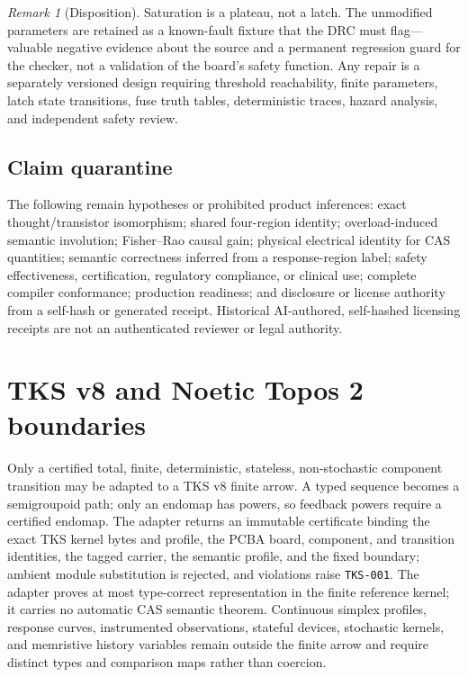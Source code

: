 \documentclass[11pt]{amsart}
\theoremstyle{definition}
\theoremstyle{remark}
\newtheorem{remark}[theorem]{Remark}
\begin{document}
\begin{remark}[Disposition]
Saturation is a plateau, not a latch. The unmodified parameters are retained as a known-fault fixture that the DRC must flag---valuable negative evidence about the source and a permanent regression guard for the checker, not a validation of the board's safety function. Any repair is a separately versioned design requiring threshold reachability, finite parameters, latch state transitions, fuse truth tables, deterministic traces, hazard analysis, and independent safety review.
\end{remark}

\subsection{Claim quarantine}
The following remain hypotheses or prohibited product inferences: exact thought/transistor isomorphism; shared four-region identity; overload-induced semantic involution; Fisher--Rao causal gain; physical electrical identity for CAS quantities; semantic correctness inferred from a response-region label; safety effectiveness, certification, regulatory compliance, or clinical use; complete compiler conformance; production readiness; and disclosure or license authority from a self-hash or generated receipt. Historical AI-authored, self-hashed licensing receipts are not an authenticated reviewer or legal authority.

\section{TKS v8 and Noetic Topos 2 boundaries}\label{sec:tks}

Only a certified total, finite, deterministic, stateless, non-stochastic component transition may be adapted to a TKS v8 finite arrow. A typed sequence becomes a semigroupoid path; only an endomap has powers, so feedback powers require a certified endomap. The adapter returns an immutable certificate binding the exact TKS kernel bytes and profile, the PCBA board, component, and transition identities, the tagged carrier, the semantic profile, and the fixed boundary; ambient module substitution is rejected, and violations raise \texttt{TKS-001}. The adapter proves at most type-correct representation in the finite reference kernel; it carries no automatic CAS semantic theorem. Continuous simplex profiles, response curves, instrumented observations, stateful devices, stochastic kernels, and memristive history variables remain outside the finite arrow and require distinct types and comparison maps rather than coercion.
\end{document}
